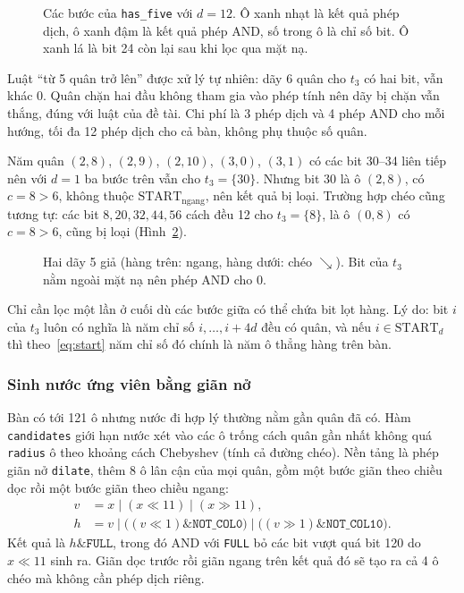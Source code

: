 \begin{figure}[H]
  \centering
  
  \caption{Các bước của \texttt{has\_five} với $d = 12$. Ô xanh nhạt là kết quả phép dịch, ô xanh đậm là kết quả phép AND, số trong ô là chỉ số bit. Ô xanh lá là bit 24 còn lại sau khi lọc qua mặt nạ.}
  \label{fig:has-five}
\end{figure}

Luật ``từ 5 quân trở lên'' được xử lý tự nhiên: dãy 6 quân cho $t_3$ có hai bit, vẫn khác 0. Quân chặn hai đầu không tham gia vào phép tính nên dãy bị chặn vẫn thắng, đúng với luật của đề tài. Chi phí là 3 phép dịch và 4 phép AND cho mỗi hướng, tối đa 12 phép dịch cho cả bàn, không phụ thuộc số quân.

\begin{vidu}
Năm quân $(2,8)$, $(2,9)$, $(2,10)$, $(3,0)$, $(3,1)$ có các bit 30--34 liên tiếp nên với $d = 1$ ba bước trên vẫn cho $t_3 = \{30\}$. Nhưng bit 30 là ô $(2, 8)$, có $c = 8 > 6$, không thuộc $\mathrm{START}_{\text{ngang}}$, nên kết quả bị loại. Trường hợp chéo cũng tương tự: các bit $8, 20, 32, 44, 56$ cách đều 12 cho $t_3 = \{8\}$, là ô $(0, 8)$ có $c = 8 > 6$, cũng bị loại (Hình~\ref{fig:lot-hang}).
\end{vidu}

\begin{figure}[H]
  \centering
  
  \caption{Hai dãy 5 giả (hàng trên: ngang, hàng dưới: chéo $\searrow$). Bit của $t_3$ nằm ngoài mặt nạ nên phép AND cho 0.}
  \label{fig:lot-hang}
\end{figure}

Chỉ cần lọc một lần ở cuối dù các bước giữa có thể chứa bit lọt hàng. Lý do: bit $i$ của $t_3$ luôn có nghĩa là năm chỉ số $i, \dots, i + 4d$ đều có quân, và nếu $i \in \mathrm{START}_d$ thì theo~\eqref{eq:start} năm chỉ số đó chính là năm ô thẳng hàng trên bàn.

\subsubsection{Sinh nước ứng viên bằng giãn nở}
Bàn có tới 121 ô nhưng nước đi hợp lý thường nằm gần quân đã có. Hàm \texttt{candidates} giới hạn nước xét vào các ô trống cách quân gần nhất không quá \texttt{radius} ô theo khoảng cách Chebyshev (tính cả đường chéo). Nền tảng là phép giãn nở \texttt{dilate}, thêm 8 ô lân cận của mọi quân, gồm một bước giãn theo chiều dọc rồi một bước giãn theo chiều ngang:
\begin{align}
  v &= x \mid (x \ll 11) \mid (x \gg 11), \\
  h &= v \mid \bigl((v \ll 1) \mathbin{\&} \texttt{NOT\_COL0}\bigr) \mid \bigl((v \gg 1) \mathbin{\&} \texttt{NOT\_COL10}\bigr).
\end{align}
Kết quả là $h \mathbin{\&} \texttt{FULL}$, trong đó AND với \texttt{FULL} bỏ các bit vượt quá bit 120 do $x \ll 11$ sinh ra. Giãn dọc trước rồi giãn ngang trên kết quả đó sẽ tạo ra cả 4 ô chéo mà không cần phép dịch riêng.

